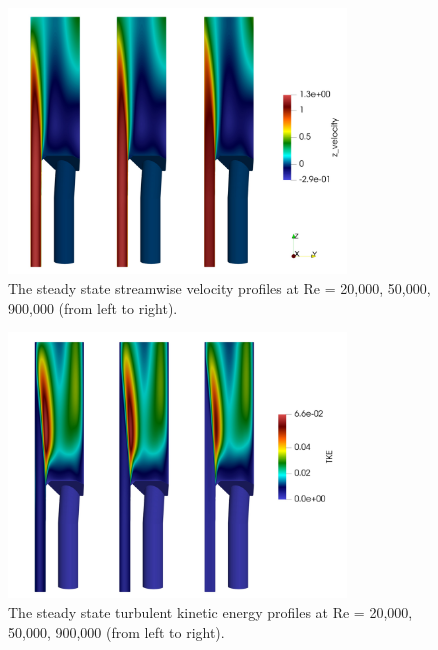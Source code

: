 \begin{figure}[!ht]
\centering
\includegraphics[width=0.8\textwidth]{./figures/reflector_vel.png}
\caption{The steady state streamwise velocity profiles at Re = 20,000, 50,000, 900,000 (from left to right). }
\label{fig:reflector_vel}
\end{figure}

\begin{figure}[!ht]
\centering
\includegraphics[width=0.8\textwidth]{./figures/reflector_tke.png}
\caption{The steady state turbulent kinetic energy profiles at Re = 20,000, 50,000, 900,000 (from left to right). }
\label{fig:reflector_tke}
\end{figure}

